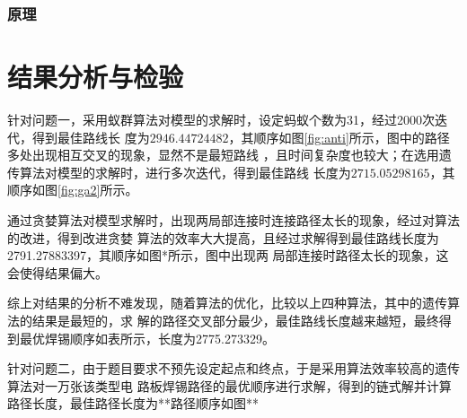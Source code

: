 \documentclass[fontset=windows,a4paper,12pt]{ctexart}
\begin{document}
      \subsubsection{原理}
    \section{结果分析与检验}
    针对问题一，采用蚁群算法对模型的求解时，设定蚂蚁个数为31，经过2000次迭代，得到最佳路线长
    度为$2946.44724482$，其顺序如图\ref{fig:anti}所示，图中的路径多处出现相互交叉的现象，显然不是最短路线
    ，且时间复杂度也较大；在选用遗传算法对模型的求解时，进行多次迭代，得到最佳路线
    长度为$2715.05298165$，其顺序如图\ref{fig:ga2}所示。

	通过贪婪算法对模型求解时，出现两局部连接时连接路径太长的现象，经过对算法的改进，得到改进贪婪
	算法的效率大大提高，且经过求解得到最佳路线长度为2791.27883397，其顺序如图*所示，图中出现两
	局部连接时路径太长的现象，这会使得结果偏大。

	综上对结果的分析不难发现，随着算法的优化，比较以上四种算法，其中的遗传算法的结果是最短的，求
	解的路径交叉部分最少，最佳路线长度越来越短，最终得到最优焊锡顺序如表所示，长度为2775.273329。

	针对问题二，由于题目要求不预先设定起点和终点，于是采用算法效率较高的遗传算法对一万张该类型电
	路板焊锡路径的最优顺序进行求解，得到的链式解并计算路径长度，最佳路径长度为**路径顺序如图**
\end{document}
